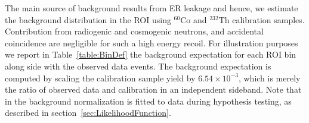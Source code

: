 The main source of background results from  ER leakage and hence, we estimate the background distribution in the ROI using $^{60}$Co and $^{232}$Th calibration samples.  
Contribution from radiogenic and cosmogenic neutrons, and accidental coincidence are negligible for such a high energy recoil.
For illustration purposes we report in Table~\ref{table:BinDef} the background expectation for each ROI bin along side with the observed data events. The background expectation is computed by scaling the calibration sample yield by $6.54\times10^{-3}$, which is merely the ratio of observed data and calibration in an independent sideband. Note that in the background normalization is fitted to data during hypothesis testing, as described in section~\ref{sec:LikelihoodFunction}. 



\begin{table}

\caption{Bins definition. The estimated background event is calculated by taking the calibration sample and scaling it by $6.54\times10^{-3}$, which is the ratio of data and calibration in a sideband.}  \label{table:BinDef} 
\end{table}


